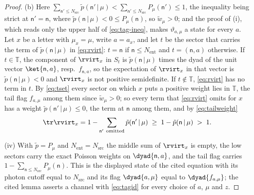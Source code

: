 \begin{proof}
(b) Here
$\sum_{\mathsf{n}'\le N_{\mathrm{src}}}\tilde p(\mathsf{n}'\,|\,\mu)
<\sum_{\mathsf{n}'\le N_{\mathrm{src}}}P_\mu(\mathsf{n}')\le1$, the inequality
being strict at $\mathsf{n}'=\mathsf{n}$, where
$\tilde p(\mathsf{n}\,|\,\mu)<0\le P_\mu(\mathsf{n})$, so $\tilde w_\mu>0$; and
the proof of
(i), which reads only the upper half of \eqref{eq:tag-ineq}, makes
$\vartheta_{a,\mu}$ a state for every $a$. Let $x$ be a letter with
$\mu_x=\mu$, write $a=a_x$, and let $t$ be the sector that carries the term of
$\tilde p(\mathsf{n}\,|\,\mu)$ in \eqref{eq:rvirt}: $t=\mathsf{n}$ if
$\mathsf{n}\le N_{\mathrm{ent}}$ and $t=(\mathsf{n},a)$ otherwise. If
$t\in\mathbb{T}$, the component of $\rvirt_x$ in $S_t$ is
$\tilde p(\mathsf{n}\,|\,\mu)$ times the dyad of the unit vector
$\ket{\mathsf{n},a}$, resp.\ $f_{\mathsf{n},a}$, so the expectation of
$\rvirt_x$ in that vector is $\tilde p(\mathsf{n}\,|\,\mu)<0$ and $\rvirt_x$ is
not positive semidefinite. If $t\notin\mathbb{T}$, \eqref{eq:rvirt} has no term
in $t$. By \eqref{eq:tset} every sector on which $x$ puts a positive weight lies
in $\mathbb{T}$, the tail flag $f_{a,\mu}$ among them since $\tilde w_\mu>0$;
so every term that \eqref{eq:rvirt} omits for $x$ has a weight
$\tilde p(\mathsf{n}'\,|\,\mu)\le0$, the term at $\mathsf{n}$ among them, and by
\eqref{eq:tailweight}
\begin{equation*}
  \tr\rvirt_x
  =1-\sum_{\mathsf{n}'\ \text{omitted}}\tilde p(\mathsf{n}'\,|\,\mu)
  \;\ge\;1-\tilde p(\mathsf{n}\,|\,\mu)\;>\;1 .
\end{equation*}

(iv) With $\tilde p=P_\mu$ and $N_{\mathrm{ent}}=N_{\mathrm{src}}$ the middle
sum of $\rvirt_x$ is empty, the low sectors carry the exact Poisson weights on
$\dyad{\mathsf{n},a}$, and the tail flag carries
$1-\sum_{\mathsf{n}\le N_{\mathrm{src}}}P_\mu(\mathsf{n})$. This is the
displayed state of the cited equation with its photon cutoff equal to
$N_{\mathrm{src}}$ and its flag $\dyad{a,\mu}$ equal to $\dyad{f_{a,\mu}}$; the
cited lemma asserts a channel with \eqref{eq:tagid} for every choice of $a$,
$\mu$ and $z$.
\end{proof}
